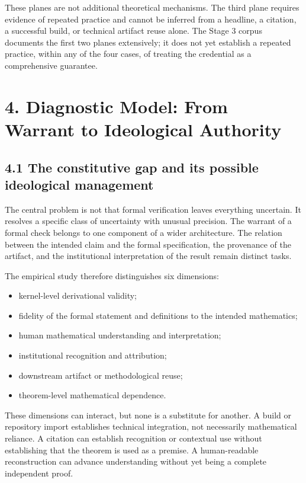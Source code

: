 \documentclass[sn-apa]{sn-jnl}
\begin{document}
These planes are not additional theoretical mechanisms. The third plane requires evidence of repeated practice and cannot be inferred from a headline, a citation, a successful build, or technical artifact reuse alone. The Stage 3 corpus documents the first two planes extensively; it does not yet establish a repeated practice, within any of the four cases, of treating the credential as a comprehensive guarantee.

\section{4. Diagnostic Model: From Warrant to Ideological Authority}

\subsection{4.1 The constitutive gap and its possible ideological management}

The central problem is not that formal verification leaves everything uncertain. It resolves a specific class of uncertainty with unusual precision. The warrant of a formal check belongs to one component of a wider architecture. The relation between the intended claim and the formal specification, the provenance of the artifact, and the institutional interpretation of the result remain distinct tasks.

The empirical study therefore distinguishes six dimensions:

\begin{itemize}

\item kernel-level derivational validity;

\item fidelity of the formal statement and definitions to the intended mathematics;

\item human mathematical understanding and interpretation;

\item institutional recognition and attribution;

\item downstream artifact or methodological reuse;

\item theorem-level mathematical dependence.

\end{itemize}

These dimensions can interact, but none is a substitute for another. A build or repository import establishes technical integration, not necessarily mathematical reliance. A citation can establish recognition or contextual use without establishing that the theorem is used as a premise. A human-readable reconstruction can advance understanding without yet being a complete independent proof.
\end{document}
